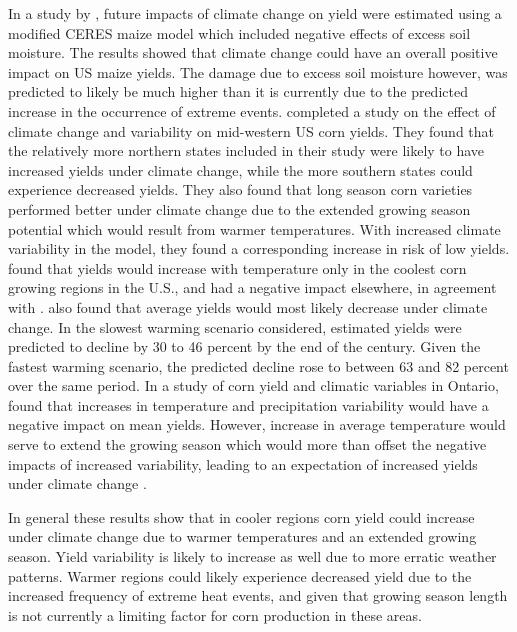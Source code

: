 In a study by \cite{rosenzweig2002increased}, future impacts of climate change on yield were estimated using a modified CERES maize model which included negative effects of excess soil moisture. The results showed that climate change could have an overall positive impact on US maize yields. The damage due to excess soil moisture however, was predicted to likely be much higher than it is currently due to the predicted increase in the occurrence of extreme events. \cite{southworth2000consequences} completed a study on the effect of climate change and variability on mid-western US corn yields. They found that the relatively more northern states included in their study were likely to have increased yields under climate change, while the more southern states could experience decreased yields. They also found that long season corn varieties performed better under climate change due to the extended growing season potential which would result from warmer temperatures. With increased climate variability in the model, they found a corresponding increase in risk of low yields. \cite{hansen1991farmer} found that yields would increase with temperature only in the coolest corn growing regions in the U.S., and had a negative impact elsewhere, in agreement with \cite{southworth2000consequences}. \cite{schlenker2009nonlinear} also found that average yields would most likely decrease under climate change. In the slowest warming scenario considered, estimated yields were predicted to decline by 30 to 46 percent by the end of the century. Given the fastest warming scenario, the predicted decline rose to between 63 and 82 percent over the same period. In a study of corn yield and climatic variables in Ontario, \cite{cabas2010crop} found that increases in temperature and precipitation variability would have a negative impact on mean yields. However, increase in average temperature would serve to extend the growing season which would more than offset the negative impacts of increased variability, leading to an expectation of increased yields under climate change \citep{cabas2010crop}.

In general these results show that in cooler regions corn yield could increase under climate change due to warmer temperatures and an extended growing season. Yield variability is likely to increase as well due to more erratic weather patterns. Warmer regions could likely experience decreased yield due to the increased frequency of extreme heat events, and given that growing season length is not currently a limiting factor for corn production in these areas.

